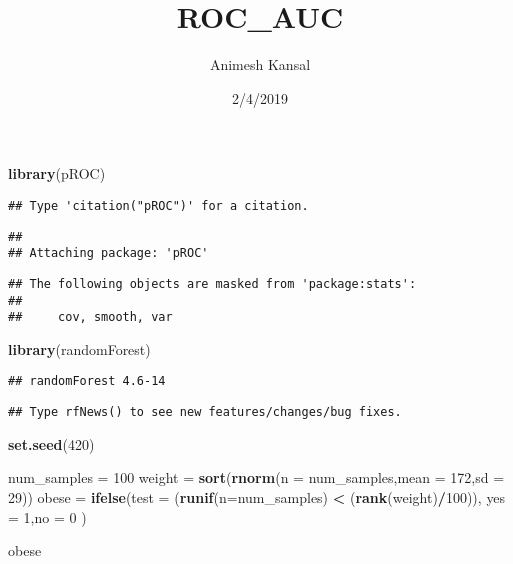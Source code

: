 \documentclass[]{article}
\title{ROC\_AUC}
\author{Animesh Kansal}
\date{2/4/2019}
\newenvironment{Shaded}{\begin{snugshade}}{\end{snugshade}}
\newcommand{\KeywordTok}[1]{\textcolor[rgb]{0.13,0.29,0.53}{\textbf{#1}}}
\newcommand{\DataTypeTok}[1]{\textcolor[rgb]{0.13,0.29,0.53}{#1}}
\newcommand{\DecValTok}[1]{\textcolor[rgb]{0.00,0.00,0.81}{#1}}
\newcommand{\StringTok}[1]{\textcolor[rgb]{0.31,0.60,0.02}{#1}}
\newcommand{\OperatorTok}[1]{\textcolor[rgb]{0.81,0.36,0.00}{\textbf{#1}}}
\newcommand{\NormalTok}[1]{#1}
\begin{document}
\maketitle

\begin{Shaded}
\begin{Highlighting}[]
\KeywordTok{library}\NormalTok{(pROC)}
\end{Highlighting}
\end{Shaded}

\begin{verbatim}
## Type 'citation("pROC")' for a citation.
\end{verbatim}

\begin{verbatim}
## 
## Attaching package: 'pROC'
\end{verbatim}

\begin{verbatim}
## The following objects are masked from 'package:stats':
## 
##     cov, smooth, var
\end{verbatim}

\begin{Shaded}
\begin{Highlighting}[]
\KeywordTok{library}\NormalTok{(randomForest)}
\end{Highlighting}
\end{Shaded}

\begin{verbatim}
## randomForest 4.6-14
\end{verbatim}

\begin{verbatim}
## Type rfNews() to see new features/changes/bug fixes.
\end{verbatim}

\begin{Shaded}
\begin{Highlighting}[]
\KeywordTok{set.seed}\NormalTok{(}\DecValTok{420}\NormalTok{)}
\end{Highlighting}
\end{Shaded}

\begin{Shaded}
\begin{Highlighting}[]
\NormalTok{num_samples =}\StringTok{ }\DecValTok{100}
\NormalTok{weight =}\StringTok{ }\KeywordTok{sort}\NormalTok{(}\KeywordTok{rnorm}\NormalTok{(}\DataTypeTok{n =}\NormalTok{ num_samples,}\DataTypeTok{mean =} \DecValTok{172}\NormalTok{,}\DataTypeTok{sd =} \DecValTok{29}\NormalTok{))}
\NormalTok{obese =}\StringTok{ }\KeywordTok{ifelse}\NormalTok{(}\DataTypeTok{test =}\NormalTok{ (}\KeywordTok{runif}\NormalTok{(}\DataTypeTok{n=}\NormalTok{num_samples) }\OperatorTok{<}\StringTok{ }\NormalTok{(}\KeywordTok{rank}\NormalTok{(weight)}\OperatorTok{/}\DecValTok{100}\NormalTok{)), }\DataTypeTok{yes =} \DecValTok{1}\NormalTok{,}\DataTypeTok{no =} \DecValTok{0}\NormalTok{ )}

\NormalTok{obese}
\end{Highlighting}
\end{Shaded}
\end{document}
